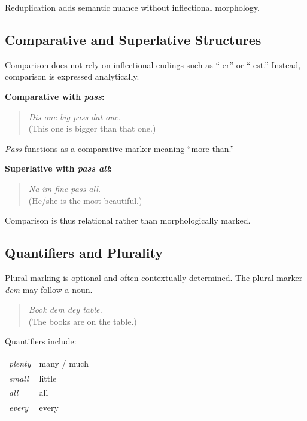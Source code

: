 \documentclass[12pt]{article}
\begin{document}
Reduplication adds semantic nuance without inflectional morphology.

\subsection{Comparative and Superlative Structures}

Comparison does not rely on inflectional endings such as “-er” or “-est.” Instead, comparison is expressed analytically.

\textbf{Comparative with \textit{pass}:}

\begin{quote}
\textit{Dis one big pass dat one.} \\
(This one is bigger than that one.)
\end{quote}

\textit{Pass} functions as a comparative marker meaning “more than.”

\textbf{Superlative with \textit{pass all}:}

\begin{quote}
\textit{Na im fine pass all.} \\
(He/she is the most beautiful.)
\end{quote}

Comparison is thus relational rather than morphologically marked.

\subsection{Quantifiers and Plurality}

Plural marking is optional and often contextually determined. The plural marker \textit{dem} may follow a noun.

\begin{quote}
\textit{Book dem dey table.} \\
(The books are on the table.)
\end{quote}

Quantifiers include:

\begin{center}
\begin{tabular}{ll}
\textit{plenty} & many / much \\
\textit{small} & little \\
\textit{all} & all \\
\textit{every} & every \\
\end{tabular}
\end{center}
\end{document}
